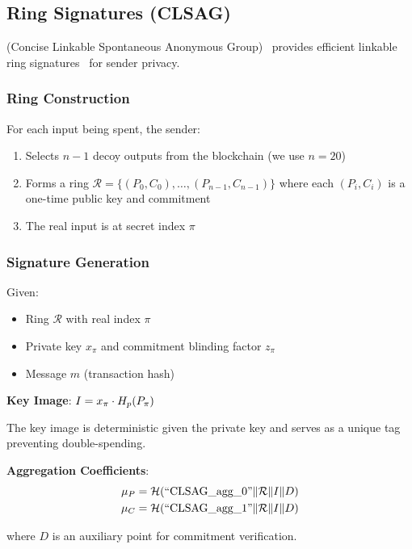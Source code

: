 \subsection{Ring Signatures (CLSAG)}
\label{sec:clsag}

\CLSAG (Concise Linkable Spontaneous Anonymous Group)~\cite{clsag}
provides efficient linkable ring signatures~\cite{fujisaki2007} for sender privacy.

\subsubsection{Ring Construction}

For each input being spent, the sender:
\begin{enumerate}
  \item Selects $n-1$ decoy outputs from the blockchain (we use $n = 20$)
  \item Forms a ring $\mathcal{R} = \{(P_0, C_0), \ldots, (P_{n-1}, C_{n-1})\}$
    where each $(P_i, C_i)$ is a one-time public key and commitment
  \item The real input is at secret index $\pi$
\end{enumerate}

\subsubsection{Signature Generation}

Given:
\begin{itemize}
  \item Ring $\mathcal{R}$ with real index $\pi$
  \item Private key $x_\pi$ and commitment blinding factor $z_\pi$
  \item Message $m$ (transaction hash)
\end{itemize}

\textbf{Key Image}: $I = x_\pi \cdot H_p(P_\pi)$

The key image is deterministic given the private key and serves as a
unique tag preventing double-spending.

\textbf{Aggregation Coefficients}:
\begin{align}
\mu_P &= \mathcal{H}(\text{``CLSAG\_agg\_0''} \| \mathcal{R} \| I \| D) \\
\mu_C &= \mathcal{H}(\text{``CLSAG\_agg\_1''} \| \mathcal{R} \| I \| D)
\end{align}

where $D$ is an auxiliary point for commitment verification.

